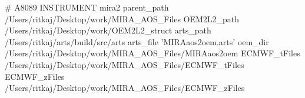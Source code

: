 # A8089
INSTRUMENT                  mira2
parent_path               /Users/ritkaj/Desktop/work/MIRA_AOS_Files
OEM2L2_path               /Users/ritkaj/Desktop/work/OEM2L2_struct
arts_path                 /Users/ritkaj/arts/build/src/arts
arts_file                 'MIRAaos2oem.arts'
oem_dir                   /Users/ritkaj/Desktop/work/MIRA_AOS_Files/MIRAaos2oem
ECMWF_tFiles              /Users/ritkaj/Desktop/work/MIRA_AOS_Files/ECMWF_tFiles
ECMWF_zFiles              /Users/ritkaj/Desktop/work/MIRA_AOS_Files/ECMWF_zFiles
